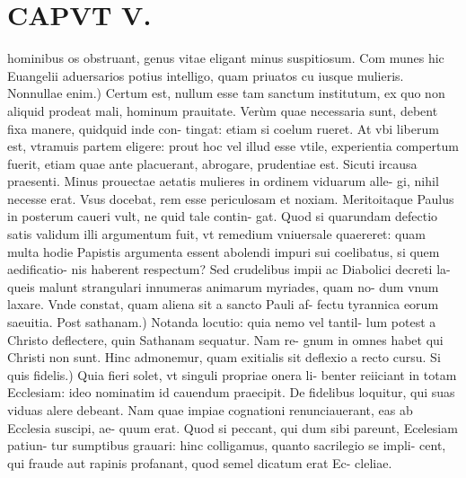 \documentclass{article}
\begin{document}
\begin{pages}
\subsection*{\textit{}}
\section*{CAPVT V. }
\marginpar{[ p.65 ]}\pstart hominibus os obstruant, genus vitae eligant minus suspitiosum. Com munes hic Euangelii aduersarios potius intelligo, quam priuatos cu iusque mulieris.  \pend\pstart Nonnullae enim.) Certum est, nullum esse tam sanctum institutum, ex quo non aliquid prodeat mali, hominum prauitate. Verùm quae necessaria sunt, debent fixa manere, quidquid inde con- tingat: etiam si coelum rueret. At vbi liberum est, vtramuis partem eligere: prout hoc vel illud esse vtile, experientia compertum fuerit, etiam quae ante placuerant, abrogare, prudentiae est. Sicuti ircausa praesenti. Minus prouectae aetatis mulieres in ordinem viduarum alle- gi, nihil necesse erat. Vsus docebat, rem esse periculosam et noxiam. Meritoitaque Paulus in posterum caueri vult, ne quid tale contin- gat. Quod si quarundam defectio satis validum illi argumentum fuit, vt remedium vniuersale quaereret: quam multa hodie Papistis argumenta essent abolendi impuri sui coelibatus, si quem aedificatio- nis haberent respectum? Sed crudelibus impii ac Diabolici decreti la- queis malunt strangulari innumeras animarum myriades, quam no- dum vnum laxare. Vnde constat, quam aliena sit a sancto Pauli af- fectu tyrannica eorum saeuitia.  \pend\pstart Post sathanam.) Notanda locutio: quia nemo vel tantil- lum potest a Christo deflectere, quin Sathanam sequatur. Nam re- gnum in omnes habet qui Christi non sunt. Hinc admonemur, quam exitialis sit deflexio a recto cursu.  \pend\pstart Si quis fidelis.) Quia fieri solet, vt singuli propriae onera li- benter reiiciant in totam Ecclesiam: ideo nominatim id cauendum praecipit. De fidelibus loquitur, qui suas viduas alere debeant. Nam quae impiae cognationi renunciauerant, eas ab Ecclesia suscipi, ae- quum erat. Quod si peccant, qui dum sibi pareunt, Ecelesiam patiun- tur sumptibus grauari: hinc colligamus, quanto sacrilegio se impli- cent, qui fraude aut rapinis profanant, quod semel dicatum erat Ec- cleliae.  \pend
{}
{}

\end{pages}
\end{document}
